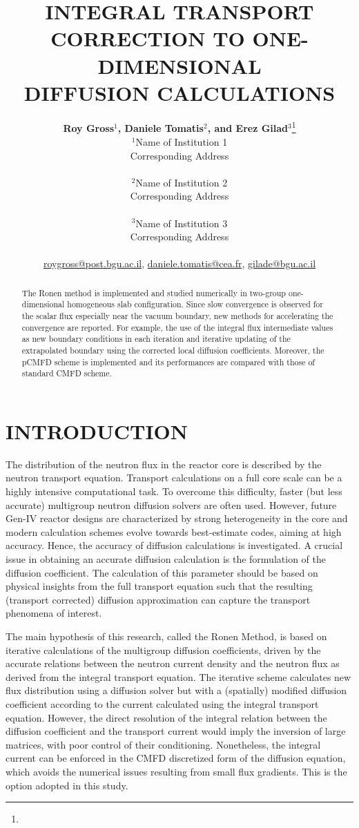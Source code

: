 \documentclass[letterpaper]{physor2020}
\title{INTEGRAL TRANSPORT CORRECTION TO ONE-DIMENSIONAL\\ DIFFUSION CALCULATIONS}
\author{%
  \textbf{Roy Gross$^1$, Daniele Tomatis$^2$, and Erez Gilad$^3$}\footnote{} \\
  $^1$Name of Institution 1  \\
  Corresponding Address \\ 
\\
  $^2$Name of Institution 2  \\ 
    Corresponding Address \\ 
\\
  $^3$Name of Institution 3  \\
     Corresponding Address \\
     \\
  \url{roygross@post.bgu.ac.il}, \url{daniele.tomatis@cea.fr}, \url{gilade@bgu.ac.il}
}
\begin{document}
\maketitle
\justify 

\begin{abstract}
  The Ronen method is implemented and studied numerically in two-group one-dimensional homogeneous slab configuration. Since slow convergence is observed for the scalar flux especially near the vacuum boundary, new methods for accelerating the convergence are reported. For example, the use of the integral flux intermediate values as new boundary conditions in each iteration and iterative updating of the extrapolated boundary using the corrected local diffusion coefficients. Moreover, the pCMFD scheme is implemented and its performances are compared with those of standard CMFD scheme.
\end{abstract}

\section{INTRODUCTION} 
\label{sec:intro}

The distribution of the neutron flux in the reactor core is described by the neutron transport equation. Transport calculations on a full core scale can be a highly intensive computational task. To overcome this difficulty, faster (but less accurate) multigroup neutron diffusion solvers are often used. However, future Gen-IV reactor designs are characterized by strong heterogeneity in the core and modern calculation schemes evolve towards best-estimate codes, aiming at high accuracy. Hence, the accuracy of diffusion calculations is investigated. A crucial issue in obtaining an accurate diffusion calculation is the formulation of the diffusion coefficient. The calculation of this parameter should be based on physical insights from the full transport equation such that the resulting (transport corrected) diffusion approximation can capture the transport phenomena of interest. 

The main hypothesis of this research, called the Ronen Method, is based on iterative calculations of the multigroup diffusion coefficients, driven by the accurate relations between the neutron current density and the neutron flux as derived from the integral transport equation. The iterative scheme calculates new flux distribution using a diffusion solver but with a (spatially) modified diffusion coefficient according to the current calculated using the integral transport equation. However, the direct resolution of the integral relation between the diffusion coefficient and the transport current would imply the inversion of large matrices, with poor control of their conditioning. Nonetheless, the integral current can be enforced in the CMFD discretized form of the diffusion equation, which avoids the numerical issues resulting from small flux gradients. This is the option adopted in this study. 
\end{document}
